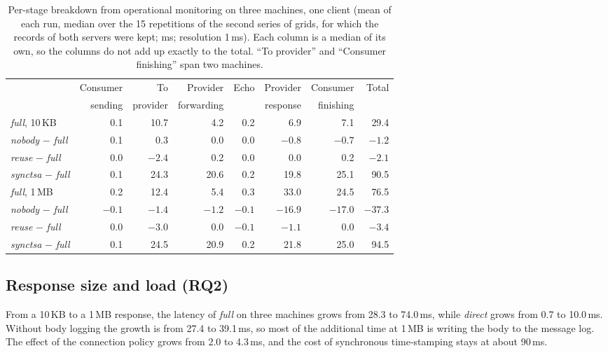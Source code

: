 \documentclass[conference,a4paper]{IEEEtran}
\begin{document}
\begin{table}[t]
\centering\small
\caption{Per-stage breakdown from operational monitoring on three machines, one client (mean of
each run, median over the 15 repetitions of the second series of grids, for which the records of both
servers were kept; ms; resolution 1\,ms). Each column is a median of its own, so the columns
do not add up exactly to the total. ``To provider'' and ``Consumer
finishing'' span two machines.}
\label{tab:stages}
\begin{tabular}{@{}lrrrrrrr@{}}
\toprule
& Consumer & To & Provider & Echo & Provider & Consumer & Total \\
& sending & provider & forwarding & & response & finishing & \\
\midrule
\emph{full}, 10\,KB & 0.1 & 10.7 & 4.2 & 0.2 & 6.9 & 7.1 & 29.4 \\
\quad \emph{nobody} $-$ \emph{full} & 0.1 & 0.3 & 0.0 & 0.0 & $-0.8$ & $-0.7$ & $-1.2$ \\
\quad \emph{reuse} $-$ \emph{full} & 0.0 & $-2.4$ & 0.2 & 0.0 & 0.0 & 0.2 & $-2.1$ \\
\quad \emph{synctsa} $-$ \emph{full} & 0.1 & 24.3 & 20.6 & 0.2 & 19.8 & 25.1 & 90.5 \\
\midrule
\emph{full}, 1\,MB & 0.2 & 12.4 & 5.4 & 0.3 & 33.0 & 24.5 & 76.5 \\
\quad \emph{nobody} $-$ \emph{full} & $-0.1$ & $-1.4$ & $-1.2$ & $-0.1$ & $-16.9$ & $-17.0$ & $-37.3$ \\
\quad \emph{reuse} $-$ \emph{full} & 0.0 & $-3.0$ & 0.0 & $-0.1$ & $-1.1$ & 0.0 & $-3.4$ \\
\quad \emph{synctsa} $-$ \emph{full} & 0.1 & 24.5 & 20.9 & 0.2 & 21.8 & 25.0 & 94.5 \\
\bottomrule
\end{tabular}
\end{table}

\subsection{Response size and load (RQ2)}

From a 10\,KB to a 1\,MB response, the latency of \emph{full} on three machines grows from 28.3 to
74.0\,ms, while \emph{direct} grows from 0.7 to 10.0\,ms. Without body logging the growth is from 27.4
to 39.1\,ms, so most of the additional time at 1\,MB is writing the body to the message log. The
effect of the connection policy grows from 2.0 to 4.3\,ms, and the cost of synchronous time-stamping
stays at about 90\,ms.
\end{document}
